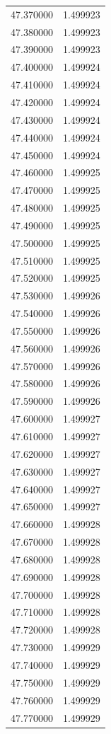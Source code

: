 \begin{tabular}{rr}
47.370000 & 1.499923 \\
47.380000 & 1.499923 \\
47.390000 & 1.499923 \\
47.400000 & 1.499924 \\
47.410000 & 1.499924 \\
47.420000 & 1.499924 \\
47.430000 & 1.499924 \\
47.440000 & 1.499924 \\
47.450000 & 1.499924 \\
47.460000 & 1.499925 \\
47.470000 & 1.499925 \\
47.480000 & 1.499925 \\
47.490000 & 1.499925 \\
47.500000 & 1.499925 \\
47.510000 & 1.499925 \\
47.520000 & 1.499925 \\
47.530000 & 1.499926 \\
47.540000 & 1.499926 \\
47.550000 & 1.499926 \\
47.560000 & 1.499926 \\
47.570000 & 1.499926 \\
47.580000 & 1.499926 \\
47.590000 & 1.499926 \\
47.600000 & 1.499927 \\
47.610000 & 1.499927 \\
47.620000 & 1.499927 \\
47.630000 & 1.499927 \\
47.640000 & 1.499927 \\
47.650000 & 1.499927 \\
47.660000 & 1.499928 \\
47.670000 & 1.499928 \\
47.680000 & 1.499928 \\
47.690000 & 1.499928 \\
47.700000 & 1.499928 \\
47.710000 & 1.499928 \\
47.720000 & 1.499928 \\
47.730000 & 1.499929 \\
47.740000 & 1.499929 \\
47.750000 & 1.499929 \\
47.760000 & 1.499929 \\
47.770000 & 1.499929 \\

\end{tabular}

